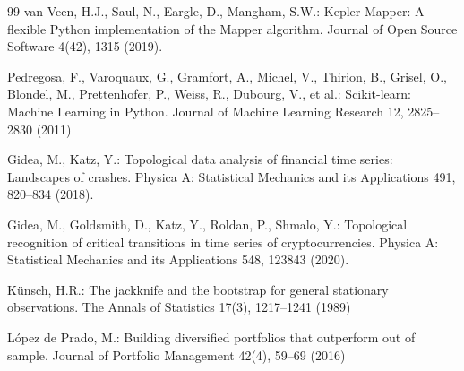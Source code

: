 \documentclass[runningheads]{llncs}
\begin{document}
\begin{thebibliography}{99}
van Veen, H.J., Saul, N., Eargle, D., Mangham, S.W.: Kepler Mapper: A flexible Python implementation of the Mapper algorithm. Journal of Open Source Software 4(42), 1315 (2019). 

Pedregosa, F., Varoquaux, G., Gramfort, A., Michel, V., Thirion, B., Grisel, O., Blondel, M., Prettenhofer, P., Weiss, R., Dubourg, V., et al.: Scikit-learn: Machine Learning in Python. Journal of Machine Learning Research 12, 2825--2830 (2011)

Gidea, M., Katz, Y.: Topological data analysis of financial time series: Landscapes of crashes. Physica A: Statistical Mechanics and its Applications 491, 820--834 (2018). 

Gidea, M., Goldsmith, D., Katz, Y., Roldan, P., Shmalo, Y.: Topological recognition of critical transitions in time series of cryptocurrencies. Physica A: Statistical Mechanics and its Applications 548, 123843 (2020). 

K\"unsch, H.R.: The jackknife and the bootstrap for general stationary observations. The Annals of Statistics 17(3), 1217--1241 (1989)

L\'opez de Prado, M.: Building diversified portfolios that outperform out of sample. Journal of Portfolio Management 42(4), 59--69 (2016)

\end{thebibliography}
\end{document}
